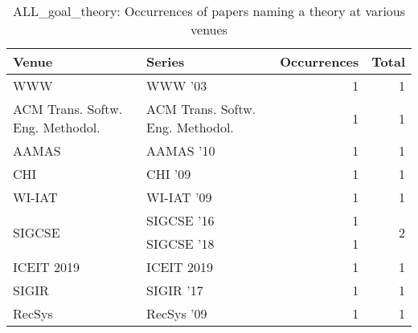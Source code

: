 \begin{table*}[t]
\begin{tabular}{llrr}
Venue & Series & Occurrences & Total\\\hline
\multirow{1}{*}{WWW } & WWW '03 & 1 & \multirow{1}{*}{1}\\
\multirow{1}{*}{ACM Trans. Softw. Eng. Methodol.} & ACM Trans. Softw. Eng. Methodol. & 1 & \multirow{1}{*}{1}\\
\multirow{1}{*}{AAMAS } & AAMAS '10 & 1 & \multirow{1}{*}{1}\\
\multirow{1}{*}{CHI } & CHI '09 & 1 & \multirow{1}{*}{1}\\
\multirow{1}{*}{WI-IAT } & WI-IAT '09 & 1 & \multirow{1}{*}{1}\\
\multirow{2}{*}{SIGCSE } & SIGCSE '16 & 1 & \multirow{2}{*}{2}\\
& SIGCSE '18 & 1 &\\
\multirow{1}{*}{ICEIT 2019} & ICEIT 2019 & 1 & \multirow{1}{*}{1}\\
\multirow{1}{*}{SIGIR } & SIGIR '17 & 1 & \multirow{1}{*}{1}\\
\multirow{1}{*}{RecSys } & RecSys '09 & 1 & \multirow{1}{*}{1}\\
\end{tabular}
\caption{ALL\_goal\_theory: Occurrences of papers naming a theory at various venues}
\end{table*}